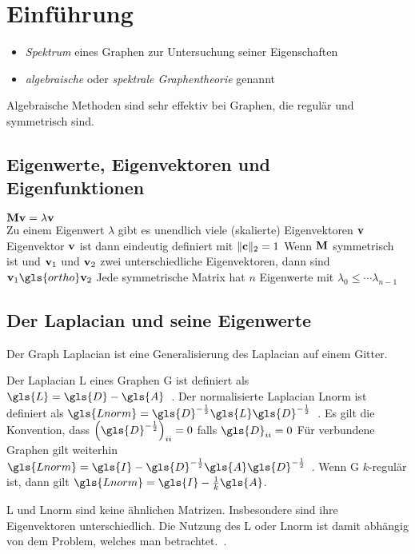 \section{Einführung}

\begin{itemize}
  \item \emph{Spektrum} eines Graphen zur Untersuchung seiner Eigenschaften
  \item \emph{algebraische} oder \emph{spektrale Graphentheorie} genannt
\end{itemize}

Algebraische Methoden sind sehr effektiv bei Graphen, die regulär und symmetrisch sind.

\subsection{Eigenwerte, Eigenvektoren und Eigenfunktionen}

$\mathbf{M}\mathbf{v} = \lambda\mathbf{v}$\\
Zu einem Eigenwert $\lambda$ gibt es unendlich viele (skalierte) Eigenvektoren $\mathbf{v}$
Eigenvektor $\mathbf{v}$ ist dann eindeutig definiert mit $\left\|\ve{c}\right\|_2 = 1$
Wenn $\mathbf{M}$ symmetrisch ist und $\mathbf{v}_1$ und $\mathbf{v}_2$ zwei unterschiedliche Eigenvektoren, dann sind $\ve{v}_1 \gls{ortho} \ve{v}_2$
Jede symmetrische Matrix hat $n$ Eigenwerte mit $\lambda_0 \leq \cdots \lambda_{n-1}$


\subsection{Der Laplacian und seine Eigenwerte}

Der Graph Laplacian ist eine Generalisierung des Laplacian auf einem Gitter.

Der Laplacian \gls{L} eines Graphen \gls{G} ist definiert als $\gls{L} = \gls{D} - \gls{A}$~\cite{Chung}.
Der normalisierte Laplacian \gls{Lnorm} ist definiert als $\gls{Lnorm} = \gls{D}^{-\frac{1}{2}} \gls{L} \gls{D}^{-\frac{1}{2}}$~\cite{Chung}.
Es gilt die Konvention, dass ${\left(\gls{D}^{-\frac{1}{2}}\right)}_{ii} = 0$ falls $\gls{D}_{ii} = 0$
Für verbundene Graphen gilt weiterhin $\gls{Lnorm} = \gls{I} - \gls{D}^{-\frac{1}{2}} \gls{A} \gls{D}^{-\frac{1}{2}}$~\cite{Chung}.
Wenn \gls{G} $k$-regulär ist, dann gilt $\gls{Lnorm} = \gls{I} - \frac{1}{k} \gls{A}$.~\cite{Chung}

\gls{L} und \gls{Lnorm} sind keine ähnlichen Matrizen.
Insbesondere sind ihre Eigenvektoren unterschiedlich.
Die Nutzung des \gls{L} oder \gls{Lnorm} ist damit abhängig von dem Problem, welches man betrachtet.~\cite{Hammond}.

